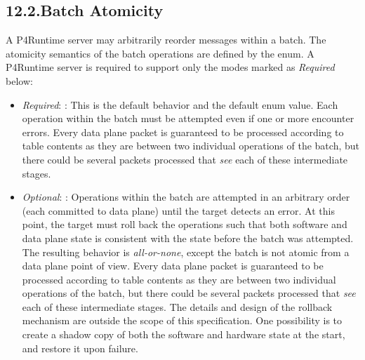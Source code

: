 \documentclass[11pt]{article}
\begin{document}
{%
\subsection{12.2.\hspace*{0.5em}Batch Atomicity}\label{sec-batch-atomicity}%

\noindent{}A P4Runtime server may arbitrarily reorder messages within a batch. The
atomicity semantics of the batch operations are defined by the 
enum. A P4Runtime server is required to support only the modes marked as
\emph{Required} below:%

\begin{itemize}%

\item{}
\emph{Required}: : This is the default behavior and the default
enum value. Each operation within the batch must be attempted even if one or
more encounter errors. Every data plane packet is guaranteed to be processed
according to table contents as they are between two individual operations of
the batch, but there could be several packets processed that \emph{see} each of
these intermediate stages.%

\item{}
\emph{Optional}: : Operations within the batch are attempted in
an arbitrary order (each committed to data plane) until the target detects an
error. At this point, the target must roll back the operations such that both
software and data plane state is consistent with the state before the batch
was attempted. The resulting behavior is \emph{all-or-none}, except the batch is
not atomic from a data plane point of view. Every data plane packet is
guaranteed to be processed according to table contents as they are between two
individual operations of the batch, but there could be several packets
processed that \emph{see} each of these intermediate stages. The details and design
of the rollback mechanism are outside the scope of this specification. One
possibility is to create a shadow copy of both the software and hardware state
at the start, and restore it upon failure.%


\end{itemize}}
\end{document}
